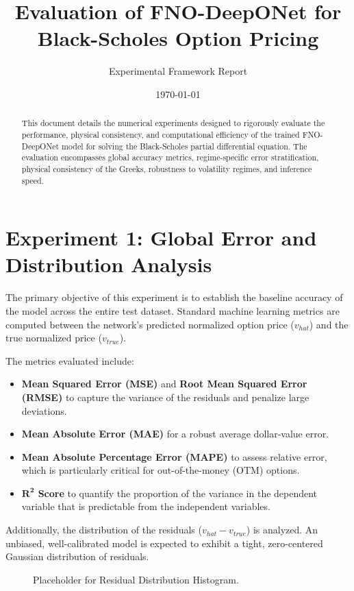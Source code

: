 \documentclass[11pt]{article}
\title{Evaluation of FNO-DeepONet for Black-Scholes Option Pricing}
\author{Experimental Framework Report}
\date{\today}
\begin{document}
\maketitle

\begin{abstract}
This document details the numerical experiments designed to rigorously evaluate the performance, physical consistency, and computational efficiency of the trained FNO-DeepONet model for solving the Black-Scholes partial differential equation. The evaluation encompasses global accuracy metrics, regime-specific error stratification, physical consistency of the Greeks, robustness to volatility regimes, and inference speed.
\end{abstract}

\section{Experiment 1: Global Error and Distribution Analysis}
The primary objective of this experiment is to establish the baseline accuracy of the model across the entire test dataset. Standard machine learning metrics are computed between the network's predicted normalized option price ($v_{hat}$) and the true normalized price ($v_{true}$). 

The metrics evaluated include:
\begin{itemize}
    \item \textbf{Mean Squared Error (MSE)} and \textbf{Root Mean Squared Error (RMSE)} to capture the variance of the residuals and penalize large deviations.
    \item \textbf{Mean Absolute Error (MAE)} for a robust average dollar-value error.
    \item \textbf{Mean Absolute Percentage Error (MAPE)} to assess relative error, which is particularly critical for out-of-the-money (OTM) options.
    \item \textbf{$\mathbf{R^2}$ Score} to quantify the proportion of the variance in the dependent variable that is predictable from the independent variables.
\end{itemize}

Additionally, the distribution of the residuals ($v_{hat} - v_{true}$) is analyzed. An unbiased, well-calibrated model is expected to exhibit a tight, zero-centered Gaussian distribution of residuals.

\begin{figure}[htpb]
    \centering
    \vspace{2cm} %
    \caption{Placeholder for Residual Distribution Histogram.}
    \label{fig:exp1}
\end{figure}
\end{document}
